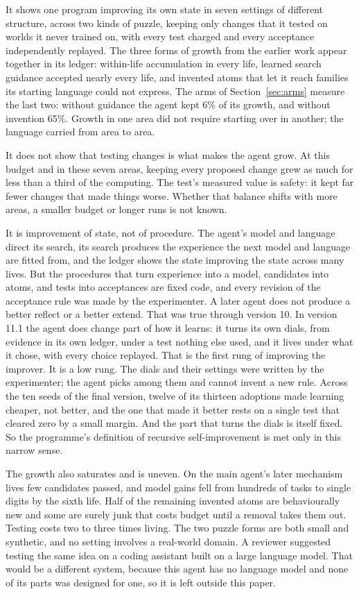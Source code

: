 \documentclass[11pt]{article}
\begin{document}
It shows one program improving its own state in seven settings of different structure, across two kinds of puzzle, keeping only changes that it tested on worlds it never trained on, with every test charged and every acceptance independently replayed. The three forms of growth from the earlier work appear together in its ledger: within-life accumulation in every life, learned search guidance accepted nearly every life, and invented atoms that let it reach families its starting language could not express. The arms of Section~\ref{sec:arms} measure the last two: without guidance the agent kept 6\% of its growth, and without invention 65\%. Growth in one area did not require starting over in another; the language carried from area to area.

It does not show that testing changes is what makes the agent grow. At this budget and in these seven areas, keeping every proposed change grew as much for less than a third of the computing. The test's measured value is safety: it kept far fewer changes that made things worse. Whether that balance shifts with more areas, a smaller budget or longer runs is not known.

It is improvement of state, not of procedure. The agent's model and language direct its search, its search produces the experience the next model and language are fitted from, and the ledger shows the state improving the state across many lives. But the procedures that turn experience into a model, candidates into atoms, and tests into acceptances are fixed code, and every revision of the acceptance rule was made by the experimenter. A later agent does not produce a better reflect or a better extend. That was true through version 10. In version 11.1 the agent does change part of how it learns: it turns its own dials, from evidence in its own ledger, under a test nothing else used, and it lives under what it chose, with every choice replayed. That is the first rung of improving the improver. It is a low rung. The dials and their settings were written by the experimenter; the agent picks among them and cannot invent a new rule. Across the ten seeds of the final version, twelve of its thirteen adoptions made learning cheaper, not better, and the one that made it better rests on a single test that cleared zero by a small margin. And the part that turns the dials is itself fixed. So the programme's definition of recursive self-improvement is met only in this narrow sense.

The growth also saturates and is uneven. On the main agent's later mechanism lives few candidates passed, and model gains fell from hundreds of tasks to single digits by the sixth life. Half of the remaining invented atoms are behaviourally new and some are surely junk that costs budget until a removal takes them out. Testing costs two to three times living. The two puzzle forms are both small and synthetic, and no setting involves a real-world domain. A reviewer suggested testing the same idea on a coding assistant built on a large language model. That would be a different system, because this agent has no language model and none of its parts was designed for one, so it is left outside this paper.
\end{document}
